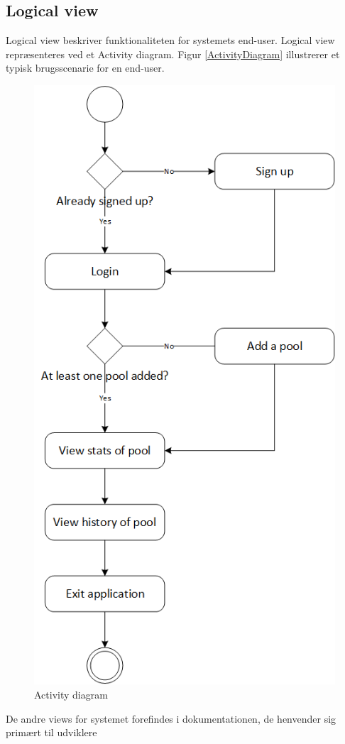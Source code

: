 \subsection{Logical view}
Logical view beskriver funktionaliteten for systemets end-user. Logical view repræsenteres ved et Activity diagram. Figur \ref{ActivityDiagram} illustrerer et typisk brugsscenarie for en end-user. 
\begin{figure}
\centering
\includegraphics[width=0.55\linewidth]{figs/arkitektur/ActivityDiagram.PNG}
\caption{Activity diagram}
\label{fig:ActivityDiagram}
\end{figure}

De andre views for systemet forefindes i dokumentationen, de henvender sig primært til udviklere
